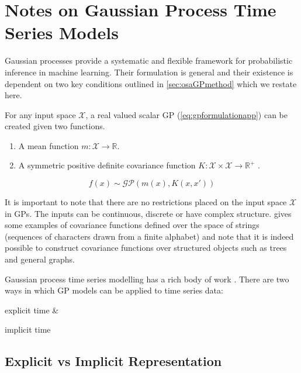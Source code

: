 \chapter{Notes on Gaussian Process Time Series Models}\label{app:gpNARX}

Gaussian processes provide a systematic and flexible framework for probabilistic inference in machine learning. 
Their formulation is general and their existence is dependent on two key conditions outlined in \cref{sec:osaGPmethod} 
which we restate here.

For any input space $\mathcal{X}$, a real valued scalar GP (\cref{eq:gpformulationapp}) can be created given two functions.

\begin{enumerate}
    \item A mean function $m: \mathcal{X} \longrightarrow \mathbb{R}$.
    \item A symmetric positive definite covariance function $K: \mathcal{X} \times \mathcal{X} \longrightarrow \mathbb{R}^{+}$ \citep[ch.~1\&2]{Berlinet2004}.
\end{enumerate}    

\begin{equation}\label{eq:gpformulationapp}
    f(x) \sim \mathcal{GP}(m(x), K(x, x'))
\end{equation}

It is important to note that there are no restrictions placed on the input space $\mathcal{X}$ in GPs. The inputs 
can be continuous, discrete or have complex structure. \citet[ch.~4, sec.~4.4]{Rasmussen:2005:GPM:1162254} gives some examples of 
covariance functions defined over the space of strings (sequences of characters drawn from a finite alphabet) and note that it is indeed 
possible to construct covariance functions over structured objects such as trees and general graphs. 

Gaussian process time series modelling has a rich body of work \citep{turner2012gaussian,frigola2016bayesian}. There 
are two ways in which GP models can be applied to time series data: \begin{enumerate*} \item explicit time \& \item implicit time \end{enumerate*}

\section*{Explicit vs Implicit Representation}

